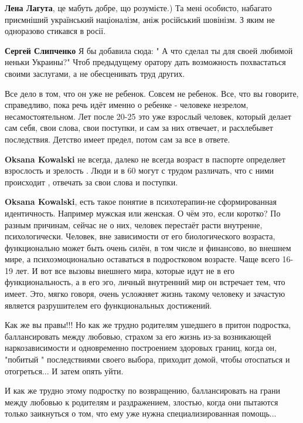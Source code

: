 \begin{itemize}
\begin{itemize}
\textbf{Лена Лагута}, це мабуть добре, що розумієте.)
Та мені особисто, набагато приємніший український націоналізм, аніж російський шовінізм. З яким не одноразово стикався в росії.

\textbf{Сергей Слипченко} Я бы добавила сюда: " А что сделал ты для своей любимой неньки Украины?" Чтоб предыдущему оратору дать возможность похвастаться своими заслугами, а не обесценивать труд других.

\end{itemize} %


Все дело в том, что он уже не ребенок. Совсем не ребенок. Все, что вы говорите,
справедливо, пока речь идёт именно о ребенке - человеке незрелом,
несамостоятельном. Лет после 20-25 это уже взрослый человек, который делает сам
себя, свои слова, свои поступки, и сам за них отвечает, и расхлебывет
последствия. Детство имеет предел, потом сам за все в ответе.

\begin{itemize} %
\textbf{Oksana Kowalski} не всегда, далеко не всегда возраст в паспорте определяет взрослость и зрелость . Люди и в 60 могут с трудом различать, что с ними происходит , отвечать за свои слова и поступки.


\textbf{Oksana Kowalski}, есть такое понятие в психотерапии-не сформированная идентичность. Например мужская или женская.
О чём это, если коротко?
По разным причинам, сейчас не о них, человек перестаёт расти внутренне, психологически.
Человек,
вне зависимости от его биологического возраста, функционально может быть очень силён, в том числе и финансово, во внешнем мире, а психоэмоционально оставаться в подростковом возрасте. Чаще всего 16-19 лет.
И вот все вызовы внешнего мира, которые идут не в его функциональность, а в его эго, личный внутренний мир он встречает тем, что имеет.
Это, мягко говоря, очень усложняет жизнь такому человеку и зачастую является разрушителем его функциональных достижений.
\end{itemize} %


Как же вы правы!!! Но как же трудно родителям ушедшего в притон подростка,
баллансировать между любовью, страхом за его жизнь из-за возникающей
наркозависимости и одновременно построением здоровых границ, когда он, "побитый
" последствиями своего выбора, приходит домой, чтобы отоспаться и отогреться...
И затем опять уйти.

И как же трудно этому подростку по возвращению, баллансировать на грани между
любовью к родителям и раздражением, злостью, когда они пытаются только
заикнуться о том, что ему уже нужна специализированная помощь...

\end{itemize} %

